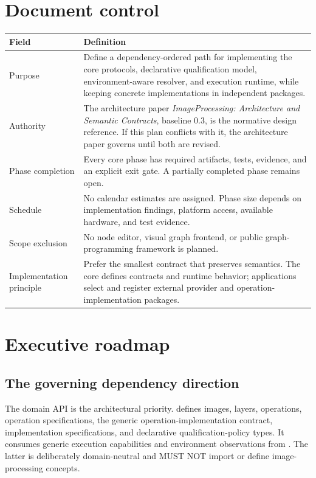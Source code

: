 \section*{Document control}
\begin{longtable}{@{}L{0.22\textwidth}p{0.70\textwidth}@{}}
\toprule
\textbf{Field} & \textbf{Definition} \\
\midrule
Purpose & Define a dependency-ordered path for implementing the core protocols, declarative qualification model, environment-aware resolver, and execution runtime, while keeping concrete implementations in independent packages. \\
Authority & The architecture paper \emph{ImageProcessing: Architecture and Semantic Contracts}, baseline 0.3, is the normative design reference. If this plan conflicts with it, the architecture paper governs until both are revised. \\
Phase completion & Every core phase has required artifacts, tests, evidence, and an explicit exit gate. A partially completed phase remains open. \\
Schedule & No calendar estimates are assigned. Phase size depends on implementation findings, platform access, available hardware, and test evidence. \\
Scope exclusion & No node editor, visual graph frontend, or public graph-programming framework is planned. \\
Implementation principle & Prefer the smallest contract that preserves semantics. The core defines contracts and runtime behavior; applications select and register external provider and operation-implementation packages. \\
\bottomrule
\end{longtable}

\section{Executive roadmap}

\subsection{The governing dependency direction}

The domain API is the architectural priority. \IPP{} defines images, layers, operations, operation specifications, the generic operation-implementation contract, implementation specifications, and declarative qualification-policy types. It consumes generic execution capabilities and environment observations from \GEP{}. The latter is deliberately domain-neutral and MUST NOT import or define image-processing concepts.

